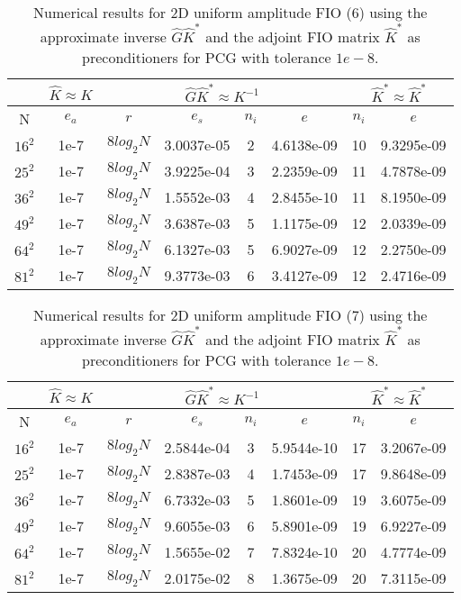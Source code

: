 \documentclass[11pt]{article}
\begin{document}
\begin{table}[!htbp]
\centering
\begin{tabular}{|c|c|c|c|c|c|c|c|}
\hline
\multicolumn{1}{c|}{}& \multicolumn{1}{c|}{$\hat{K} \approx K$} & \multicolumn{4}{c|}{$\hat{G}\hat{K}^{*}\approx K^{-1}$}& \multicolumn{2}{c|}{$\hat{K}^{*} \approx \hat{K}^{*}$}\\
\hline
N & $e_{a}$ & $r$ & $e_{s}$ & $n_{i}$ & $e$ & $n_{i}$ & $e$ \\ 
\hline
$16^2$ & 1e-7 & $8 log_{2}N$ & 3.0037e-05 & 2 & 4.6138e-09 & 10 & 9.3295e-09 \\
\hline
$25^2$ & 1e-7 & $8 log_{2}N$ & 3.9225e-04 & 3 & 2.2359e-09 & 11 & 4.7878e-09 \\
\hline
$36^2$ & 1e-7 & $8 log_{2}N$ & 1.5552e-03 & 4 & 2.8455e-10 & 11 & 8.1950e-09 \\
\hline
$49^2$ & 1e-7 & $8 log_{2}N$ & 3.6387e-03 & 5 & 1.1175e-09 & 12 & 2.0339e-09 \\
\hline
$64^2$ & 1e-7 & $8 log_{2}N$ & 6.1327e-03 & 5 & 6.9027e-09 & 12 & 2.2750e-09 \\
\hline
$81^2$ & 1e-7 & $8 log_{2}N$ & 9.3773e-03 & 6 & 3.4127e-09 & 12 & 2.4716e-09 \\

\end{tabular}

\caption{Numerical results for 2D uniform amplitude FIO (6) using the approximate inverse $\hat{G}\hat{K}^{*}$ and the adjoint FIO matrix $\hat{K}^{*}$ as preconditioners for PCG with tolerance $1e-8$.}
\label{2d-k1f}
\end{table}


\begin{table}[!htbp]
\centering
\begin{tabular}{|c|c|c|c|c|c|c|c|}
\hline
\multicolumn{1}{c|}{}& \multicolumn{1}{c|}{$\hat{K} \approx K$} & \multicolumn{4}{c|}{$\hat{G}\hat{K}^{*}\approx K^{-1}$}& \multicolumn{2}{c|}{$\hat{K}^{*} \approx \hat{K}^{*}$}\\
\hline
N & $e_{a}$ & $r$ & $e_{s}$ & $n_{i}$ & $e$ & $n_{i}$ & $e$ \\ 
\hline
$16^2$ & 1e-7 & $8 log_{2}N$ & 2.5844e-04 & 3 & 5.9544e-10 & 17 & 3.2067e-09 \\
\hline
$25^2$ & 1e-7 & $8 log_{2}N$ & 2.8387e-03 & 4 & 1.7453e-09 & 17 & 9.8648e-09 \\
\hline
$36^2$ & 1e-7 & $8 log_{2}N$ & 6.7332e-03 & 5 & 1.8601e-09 & 19 & 3.6075e-09 \\
\hline
$49^2$ & 1e-7 & $8 log_{2}N$ & 9.6055e-03 & 6 & 5.8901e-09 & 19 & 6.9227e-09 \\
\hline
$64^2$ & 1e-7 & $8 log_{2}N$ & 1.5655e-02 & 7 & 7.8324e-10 & 20 & 4.7774e-09 \\
\hline
$81^2$ & 1e-7 & $8 log_{2}N$ & 2.0175e-02 & 8 & 1.3675e-09 & 20 & 7.3115e-09 \\

\end{tabular}

\caption{Numerical results for 2D uniform amplitude FIO (7) using the approximate inverse $\hat{G}\hat{K}^{*}$ and the adjoint FIO matrix $\hat{K}^{*}$ as preconditioners for PCG with tolerance $1e-8$.}
\label{2d-k2f}
\end{table}
\end{document}

